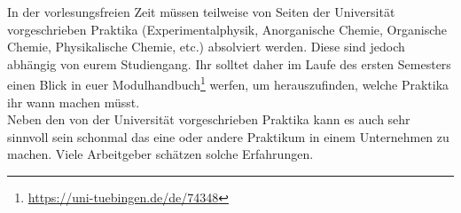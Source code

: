 In der vorlesungsfreien Zeit müssen teilweise von Seiten der Universität vorgeschrieben Praktika (Experimentalphysik, Anorganische Chemie, Organische Chemie, Physikalische Chemie, etc.) absolviert werden. Diese sind jedoch abhängig von eurem Studiengang. Ihr solltet daher im Laufe des ersten Semesters einen Blick in euer Modulhandbuch\footnote{\url{https://uni-tuebingen.de/de/74348}} werfen, um herauszufinden, welche Praktika ihr wann machen müsst.\\	%

Neben den von der Universität vorgeschrieben Praktika kann es auch sehr sinnvoll sein schonmal das eine oder andere Praktikum in einem Unternehmen zu machen. Viele Arbeitgeber schätzen solche Erfahrungen.

\vfill
